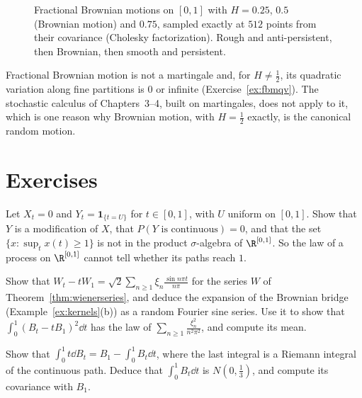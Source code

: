 \begin{figure}[ht]
\centering
{}
\caption{Fractional Brownian motions on $[0,1]$ with $H=0.25$, $0.5$ (Brownian motion) and $0.75$, sampled exactly at $512$ points from their covariance (Cholesky factorization). Rough and anti-persistent, then
Brownian, then smooth and persistent.}
\label{fig:fbm}
\end{figure}

\begin{remark}
Fractional Brownian motion is not a martingale and, for $H\neq\frac12$, its quadratic variation along fine partitions is $0$ or infinite (Exercise~\ref{ex:fbmqv}). The stochastic calculus of Chapters~3--4, built on
martingales, does not apply to it, which is one reason why Brownian motion, with $H=\frac12$ exactly, is the canonical random motion.
\end{remark}

\section{Exercises}

\begin{exercise}[$\star$]\label{ex:notevent}
Let $X_t=0$ and $Y_t=\mathbf 1_{\{t=U\}}$ for $t\in[0,1]$, with $U$ uniform on $[0,1]$. Show that $Y$ is a modification of $X$, that $P(Y\text{ is continuous})=0$, and that the set $\{x:\sup_tx(t)\ge1\}$ is not in the product $\sigma$-algebra of $\R^{[0,1]}$. So the law of a
process on $\R^{[0,1]}$ cannot tell whether its paths reach $1$.
\end{exercise}

\begin{exercise}[$\star$]\label{ex:bridgeseries}
Show that $W_t-tW_1=\sqrt2\sum_{n\ge1}\xi_n\frac{\sin n\pi t}{n\pi}$ for the series $W$ of Theorem~\ref{thm:wienerseries}, and deduce the expansion of the Brownian bridge (Example~\ref{ex:kernels}(b)) as a random
Fourier sine series. Use it to show that $\int_0^1(B_t-tB_1)^2\dd t$ has the law of $\sum_{n\ge1}\frac{\xi_n^2}{n^2\pi^2}$, and compute its mean.
\end{exercise}

\begin{exercise}[$\star$]\label{ex:intbyparts}
Show that $\int_0^1t\dd B_t=B_1-\int_0^1B_t\dd t$, where the last integral is a Riemann integral of the continuous path. Deduce that $\int_0^1B_t\dd t$ is $N(0,\frac13)$, and compute its covariance with $B_1$.
\end{exercise}

